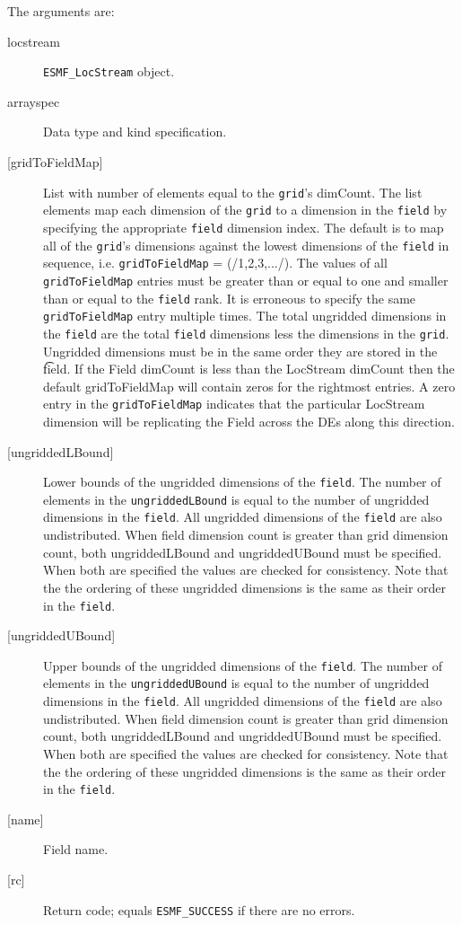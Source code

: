    The arguments are:
   \begin{description}
   \item [locstream]
   {\tt ESMF\_LocStream} object.
   \item [arrayspec]
   Data type and kind specification.
   \item [{[gridToFieldMap]}]
   List with number of elements equal to the
   {\tt grid}'s dimCount. The list elements map each dimension
   of the {\tt grid} to a dimension in the {\tt field} by
   specifying the appropriate {\tt field} dimension index. The default is to
   map all of the {\tt grid}'s dimensions against the lowest dimensions of
   the {\tt field} in sequence, i.e. {\tt gridToFieldMap} = (/1,2,3,.../).
   The values of all {\tt gridToFieldMap} entries must be greater than or equal
   to one and smaller than or equal to the {\tt field} rank.
   It is erroneous to specify the same {\tt gridToFieldMap} entry
   multiple times. The total ungridded dimensions in the {\tt field}
   are the total {\tt field} dimensions less
   the dimensions in
   the {\tt grid}. Ungridded dimensions must be in the same order they are
   stored in the {\t field}.
   If the Field dimCount is less than the LocStream dimCount then the default
   gridToFieldMap will contain zeros for the rightmost entries. A zero
   entry in the {\tt gridToFieldMap} indicates that the particular
   LocStream dimension will be replicating the Field across the DEs along
   this direction.
   \item [{[ungriddedLBound]}]
   Lower bounds of the ungridded dimensions of the {\tt field}.
   The number of elements in the {\tt ungriddedLBound} is equal to the number of ungridded
   dimensions in the {\tt field}. All ungridded dimensions of the
   {\tt field} are also undistributed. When field dimension count is
   greater than grid dimension count, both ungriddedLBound and ungriddedUBound
   must be specified. When both are specified the values are checked
   for consistency. Note that the the ordering of
   these ungridded dimensions is the same as their order in the {\tt field}.
   \item [{[ungriddedUBound]}]
   Upper bounds of the ungridded dimensions of the {\tt field}.
   The number of elements in the {\tt ungriddedUBound} is equal to the number of ungridded
   dimensions in the {\tt field}. All ungridded dimensions of the
   {\tt field} are also undistributed. When field dimension count is
   greater than grid dimension count, both ungriddedLBound and ungriddedUBound
   must be specified. When both are specified the values are checked
   for consistency. Note that the the ordering of
   these ungridded dimensions is the same as their order in the {\tt field}.
   \item [{[name]}]
   Field name.
   \item [{[rc]}]
   Return code; equals {\tt ESMF\_SUCCESS} if there are no errors.
   \end{description} 
 

